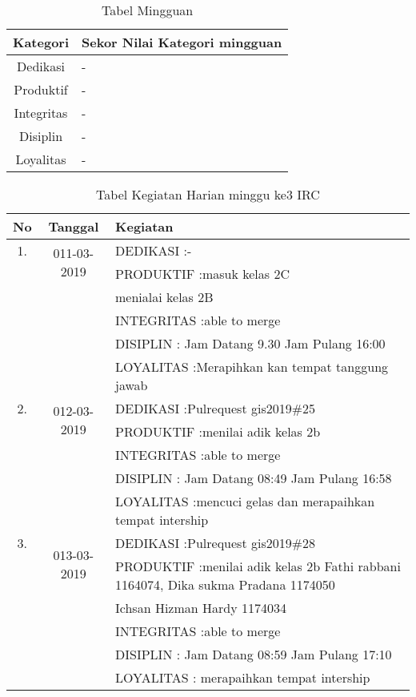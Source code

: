 \begin{table}[h]
\begin{center}
\caption{Tabel Mingguan}
\begin{tabular}{|c|l|}
\hline
Kategori& Sekor Nilai Kategori mingguan\\
\hline
Dedikasi & -\\
\hline
Produktif & -\\
\hline
Integritas & -\\
\hline
Disiplin & -\\
\hline
Loyalitas & -\\
\hline
\end{tabular}
\end{center}
\label {Tabel:contoh} 
\end{table}

\begin{table}[h]
\caption{Tabel Kegiatan Harian minggu ke3 IRC}
\centering
\begin{tabular}{|c|c|l|}
\hline
No&Tanggal&Kegiatan\\
\hline
1.&\multirow{2}{*}{011-03-2019}
&DEDIKASI :- \\
&&PRODUKTIF :masuk kelas 2C\\
		     &&menialai kelas 2B\\
&&INTEGRITAS :able to merge\\
&&DISIPLIN : Jam Datang 9.30 Jam Pulang 16:00\\
&&LOYALITAS :Merapihkan kan tempat tanggung jawab\\
\hline
2.&\multirow{2}{*}{012-03-2019}
&DEDIKASI :Pulrequest gis2019\#25 \\
&&PRODUKTIF :menilai adik kelas 2b\\
&&INTEGRITAS :able to merge\\
&&DISIPLIN : Jam Datang 08:49 Jam Pulang 16:58\\
&&LOYALITAS :mencuci gelas dan merapaihkan tempat intership\\
\hline
3.&\multirow{2}{*}{013-03-2019}
&DEDIKASI :Pulrequest gis2019\#28 \\
&&PRODUKTIF :menilai adik kelas 2b Fathi rabbani 1164074, Dika sukma Pradana 1174050\\
&&Ichsan Hizman Hardy 1174034\\
&&INTEGRITAS :able to merge\\
&&DISIPLIN : Jam Datang 08:59 Jam Pulang 17:10\\
&&LOYALITAS : merapaihkan tempat intership\\
\hline
\end{tabular}
\label{table:contoh}
\end{table}